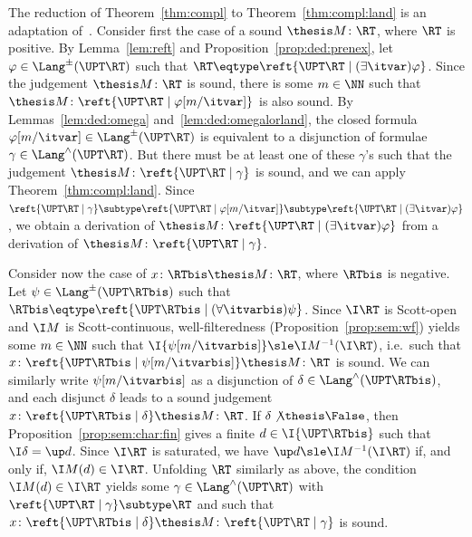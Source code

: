 The reduction of Theorem~\ref{thm:compl} to Theorem~\ref{thm:compl:land}
is an adaptation of~\cite{bk03ic,rk25wollic}.
%
Consider first the case of a sound $\thesis M \colon \RT$,
where $\RT$ is positive.
By Lemma~\ref{lem:reft} and Proposition~\ref{prop:ded:prenex},
let $\varphi \in \Lang^\pm(\UPT\RT)$
such that $\RT \eqtype \reft{\UPT\RT \mid (\exists \itvar)\varphi}$.
Since the judgement $\thesis M \colon \RT$
is sound, there is some $m \in \NN$
such that $\thesis M \colon \reft{\UPT\RT \mid \varphi[m/\itvar]}$
is also sound.
By Lemmas~\ref{lem:ded:omega} and~\ref{lem:ded:omegalorland},
the closed formula $\varphi[m/\itvar] \in \Lang^\pm(\UPT\RT)$
is equivalent to a disjunction of formulae $\gamma \in \Lang^\land(\UPT\RT)$.
But there must be at least one of these $\gamma$'s such that
the judgement $\thesis M \colon \reft{\UPT\RT \mid \gamma}$ is sound,
and we can apply Theorem~\ref{thm:compl:land}.
%
%
Since
\(
  \reft{\UPT\RT \mid \gamma}
  \subtype
  \reft{\UPT\RT \mid \varphi[m / \itvar]}
  \subtype
  \reft{\UPT\RT \mid (\exists \itvar)\varphi}
\),
we obtain a derivation of 
$\thesis M \colon \reft{\UPT\RT \mid (\exists \itvar)\varphi}$
from a derivation of $\thesis M \colon \reft{\UPT\RT \mid \gamma}$.

Consider now the case of $x \colon \RTbis \thesis M \colon \RT$,
where $\RTbis$ is negative.
Let $\psi \in \Lang^\pm(\UPT\RTbis)$
such that $\RTbis \eqtype \reft{\UPT\RTbis \mid (\forall \itvarbis)\psi}$.
Since $\I\RT$ is Scott-open and $\I M$ is Scott-continuous,
well-filteredness (Proposition~\ref{prop:sem:wf})
yields some $m \in \NN$ such that
$\I{\psi[m / \itvarbis]} \sle \I M^{-1}(\I\RT)$,
i.e.\ such that
$x \colon \reft{\UPT\RTbis \mid \psi[m / \itvarbis]} \thesis M \colon \RT$
is sound.
%
We can similarly write $\psi[m / \itvarbis]$ as a disjunction
of $\delta \in \Lang^\land(\UPT\RTbis)$,
and each disjunct $\delta$ leads to a sound judgement
$x \colon \reft{\UPT\RTbis \mid \delta} \thesis M \colon \RT$.
% 
If $\delta \not\thesis \False$, then Proposition~\ref{prop:sem:char:fin}
gives a finite $d \in \I{\UPT\RTbis}$ such that $\I\delta = \up d$.
Since $\I\RT$ is saturated, we have
$\up d \sle \I M^{-1}(\I\RT)$ if, and only if, $\I M(d) \in \I\RT$.
Unfolding $\RT$ similarly as above,
the condition $\I M(d) \in \I\RT$ yields some $\gamma \in \Lang^\land(\UPT\RT)$
with $\reft{\UPT\RT \mid \gamma} \subtype \RT$
and such that
$x \colon \reft{\UPT\RTbis \mid \delta} \thesis M \colon \reft{\UPT\RT \mid \gamma}$
is sound.%
%
%


